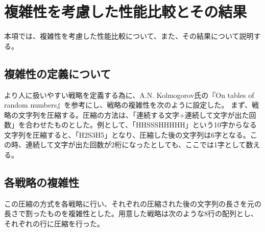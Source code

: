 \section{複雑性を考慮した性能比較とその結果}

本項では、複雑性を考慮した性能比較について、また、その結果について説明する。

\subsection{複雑性の定義について}

より人に扱いやすい戦略を定義する為に、A.N. Kolmogorov氏の『On tables of random numbers』を参考にし、戦略の複雑性を次のように設定した。
まず、戦略の文字列を圧縮する。圧縮の方法は、「連続する文字+連続して文字が出た回数」を合わせたものとした。例として、「HHSSSHHHHH」という10字からなる文字列を圧縮すると、「H2S3H5」となり、圧縮した後の文字列は6字となる。この時、連続して文字が出た回数が2桁になったとしても、ここでは1字として数える。

\subsection{各戦略の複雑性}

この圧縮の方式を各戦略に行い、それぞれの圧縮された後の文字列の長さを元の長さで割ったものを複雑性とした。用意した戦略は次のような8行の配列とし、それぞれの行に圧縮を行った。\\


